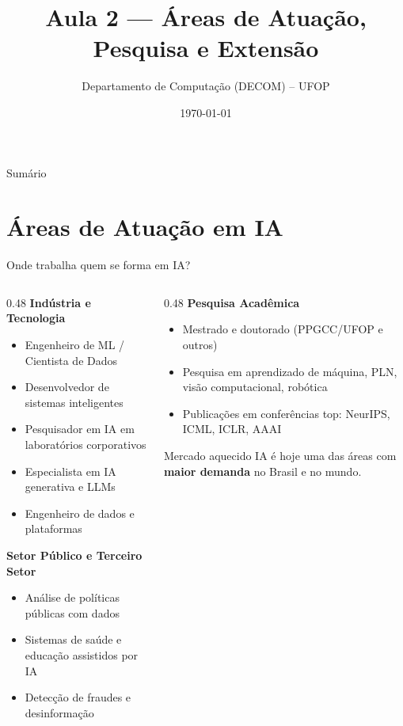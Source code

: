 \documentclass[aspectratio=169]{beamer}
\title{Aula 2 --- Áreas de Atuação, Pesquisa e Extensão}
\author{Departamento de Computação (DECOM) -- UFOP}
\date{\today}
\newcommand{\impt}[1]{\textcolor{morange}{\textbf{#1}}}
\newcommand{\ia}[1]{\textcolor{mia}{\textbf{#1}}}
\begin{document}
\begin{frame}[plain]
  \titlepage
\end{frame}

\begin{frame}{Sumário}
  \tableofcontents
\end{frame}

\section{Áreas de Atuação em IA}

\begin{frame}{Onde trabalha quem se forma em IA?}
  \small
  \begin{columns}[T]
    \begin{column}{0.48\textwidth}
      \ia{Indústria e Tecnologia}
      \begin{itemize}\setlength\itemsep{3pt}
        \item Engenheiro de ML / Cientista de Dados
        \item Desenvolvedor de sistemas inteligentes
        \item Pesquisador em IA em laboratórios corporativos
        \item Especialista em IA generativa e LLMs
        \item Engenheiro de dados e plataformas
      \end{itemize}
      \vspace{0.2cm}
      \pause
      \ia{Setor Público e Terceiro Setor}
      \begin{itemize}\setlength\itemsep{3pt}
        \item Análise de políticas públicas com dados
        \item Sistemas de saúde e educação assistidos por IA
        \item Detecção de fraudes e desinformação
      \end{itemize}
    \end{column}
    \begin{column}{0.48\textwidth}
      \pause
      \ia{Pesquisa Acadêmica}
      \begin{itemize}\setlength\itemsep{3pt}
        \item Mestrado e doutorado (PPGCC/UFOP e outros)
        \item Pesquisa em aprendizado de máquina, PLN, visão computacional, robótica
        \item Publicações em conferências top: NeurIPS, ICML, ICLR, AAAI
      \end{itemize}
      \pause
      \vspace{0.3cm}
      \begin{alertblock}{Mercado aquecido}
        IA é hoje uma das áreas com \impt{maior demanda} no Brasil e no mundo.
      \end{alertblock}
    \end{column}
  \end{columns}
\end{frame}
\end{document}
